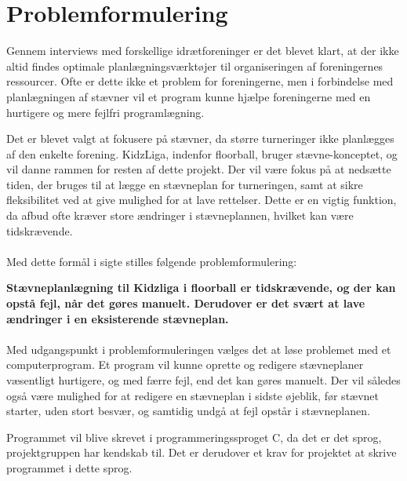\chapter{Problemformulering}\label{ch:problemformulering}
Gennem interviews med forskellige idrætforeninger er det blevet klart, at der ikke altid findes optimale planlægningsværktøjer til organiseringen af foreningernes ressourcer. Ofte er dette ikke et problem for foreningerne, men i forbindelse med planlægningen af stævner vil et program kunne hjælpe foreningerne med en hurtigere og mere fejlfri programlægning.
\par
Det er blevet valgt at fokusere på stævner, da større turneringer ikke planlægges af den enkelte forening. KidzLiga, indenfor floorball, bruger stævne-konceptet, og vil danne rammen for resten af dette projekt. Der vil være fokus på at nedsætte tiden, der bruges til at lægge en stævneplan for turneringen, samt at sikre fleksibilitet ved at give mulighed for at lave rettelser. Dette er en vigtig funktion, da afbud ofte kræver store ændringer i stævneplannen, hvilket kan være tidskrævende.
\\\\
Med dette formål i sigte stilles følgende problemformulering:
\par
\textbf{Stævneplanlægning til Kidzliga i floorball er tidskrævende, og der kan opstå fejl, når det gøres manuelt. Derudover er det svært at lave ændringer i en eksisterende stævneplan.}
\\\\
Med udgangspunkt i problemformuleringen vælges det at løse problemet med et computerprogram. Et program vil kunne oprette og redigere stævneplaner væsentligt hurtigere, og med færre fejl, end det kan gøres manuelt. Der vil således også være mulighed for at redigere en stævneplan i sidste øjeblik, før stævnet starter, uden stort besvær, og samtidig undgå at fejl opstår i stævneplanen.
\par
Programmet vil blive skrevet i programmeringssproget C, da det er det sprog, projektgruppen har kendskab til. Det er derudover et krav for projektet at skrive programmet i dette sprog.





















